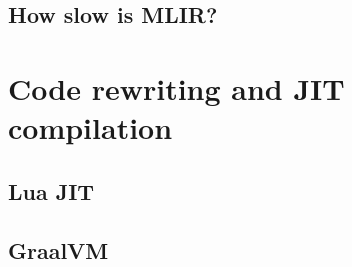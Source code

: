 \subsection{How slow is MLIR?}
\label{ssec:how-slow-is-mlir}

\section{Code rewriting and JIT compilation}
\label{sec:code-rewriting-jit}

\subsection{Lua JIT}
\label{ssec:lua-jit}

\subsection{GraalVM}
\label{ssec:graalvm}